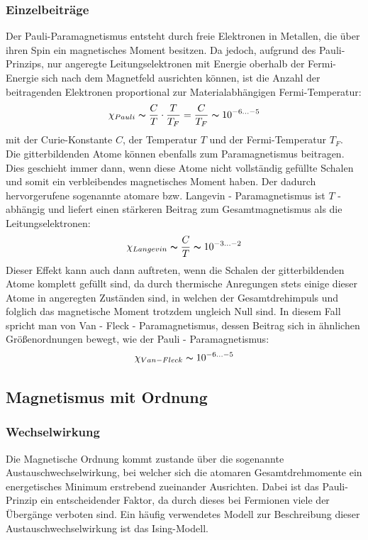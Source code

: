             \subsubsection*{Einzelbeiträge}
            Der Pauli-Paramagnetismus entsteht durch freie Elektronen in Metallen, die über ihren Spin
            ein magnetisches Moment besitzen. Da jedoch, aufgrund des Pauli-Prinzips, nur angeregte
            Leitungselektronen mit Energie oberhalb der Fermi-Energie sich nach dem Magnetfeld ausrichten können,
            ist die Anzahl der beitragenden Elektronen proportional zur Materialabhängigen Fermi-Temperatur:
            \begin{equation}
                \chi_{Pauli} \thicksim \frac{C}{T} \cdot \frac{T}{T_{F}} = \frac{C}{T_F}\thicksim 10^{-6 ... -5}
            \end{equation}
            mit der Curie-Konstante $C$, der Temperatur $T$ und der Fermi-Temperatur $T_F$.
            \\
            Die gitterbildenden Atome können ebenfalls zum Paramagnetismus beitragen.
            Dies geschieht immer dann, wenn diese Atome nicht vollständig gefüllte Schalen und somit ein verbleibendes magnetisches Moment haben.
            Der dadurch hervorgerufene sogenannte atomare bzw. Langevin - Paramagnetismus ist $T$ - abhängig und liefert einen stärkeren Beitrag zum Gesamtmagnetismus als die Leitungselektronen:
            \begin{equation}
            	\chi_{Langevin} \thicksim \frac{C}{T} \thicksim 10^{-3 ... -2}
            \end{equation}
			Dieser Effekt kann auch dann auftreten, wenn die Schalen der gitterbildenden Atome komplett gefüllt sind, da durch thermische Anregungen stets einige dieser Atome in angeregten Zuständen sind, in welchen der Gesamtdrehimpuls und folglich das magnetische Moment trotzdem ungleich Null sind. In diesem Fall spricht man von Van - Fleck - Paramagnetismus, dessen Beitrag sich in ähnlichen Größenordnungen bewegt, wie der Pauli - Paramagnetismus:
			\begin{equation}
				\chi_{Van - Fleck} \thicksim 10^{-6 ... -5}
			\end{equation}
			


    \subsection{Magnetismus mit Ordnung}
        \subsubsection*{Wechselwirkung}
            Die Magnetische Ordnung kommt zustande über die sogenannte Austauschwechselwirkung, bei welcher sich
            die atomaren Gesamtdrehmomente ein energetisches Minimum erstrebend zueinander Ausrichten. Dabei ist
            das Pauli-Prinzip ein entscheidender Faktor, da durch dieses bei Fermionen viele der Übergänge verboten sind.
            Ein häufig verwendetes Modell zur Beschreibung dieser Austauschwechselwirkung ist das Ising-Modell.
